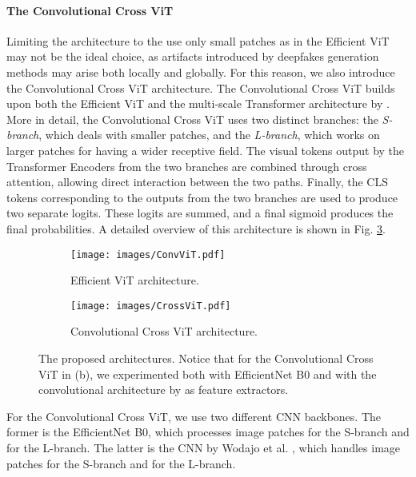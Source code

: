 \documentclass[runningheads]{llncs}
\begin{document}
\paragraph{The Convolutional Cross ViT}
Limiting the architecture to the use only small patches as in the Efficient ViT may not be the ideal choice, as artifacts introduced by deepfakes generation methods may arise both locally and globally. 
For this reason, we also introduce the Convolutional Cross ViT architecture.
The Convolutional Cross ViT builds upon both the Efficient ViT and the multi-scale Transformer architecture by \cite{chen2021crossvit}. More in detail, the Convolutional Cross ViT uses two distinct branches: the \textit{S-branch}, which deals with smaller patches, and the \textit{L-branch}, which works on larger patches for having a wider receptive field. The visual tokens output by the Transformer Encoders from the two branches are combined through cross attention, allowing direct interaction between the two paths. Finally, the CLS tokens corresponding to the outputs from the two branches are used to produce two separate logits. These logits are summed, and a final sigmoid produces the final probabilities. A detailed overview of this architecture is shown in Fig. \ref{figure:cross_vit}.\begin{figure}[t]
\begin{subfigure}[b]{0.38\textwidth}
\centering
\texttt{[image: images/ConvViT.pdf]}
\caption{Efficient ViT architecture.}
    \label{figure:vit}
\end{subfigure}
\hspace{0.5cm}
\begin{subfigure}[b]{0.5706\textwidth}
\centering
\texttt{[image: images/CrossViT.pdf]}
\caption{Convolutional Cross ViT architecture.}
\label{figure:cross_vit}
\end{subfigure}
\caption{The proposed architectures. Notice that for the Convolutional Cross ViT in (b), we experimented both with EfficientNet B0 and with the convolutional architecture by \cite{wodajo2021deepfake} as feature extractors.}
\end{figure}
For the Convolutional Cross ViT, we use two different CNN backbones. The former is the EfficientNet B0, which processes  image patches for the S-branch and  for the L-branch. The latter is the CNN by Wodajo et al. \cite{wodajo2021deepfake}, which handles  image patches for the S-branch and  for the L-branch.
\end{document}

